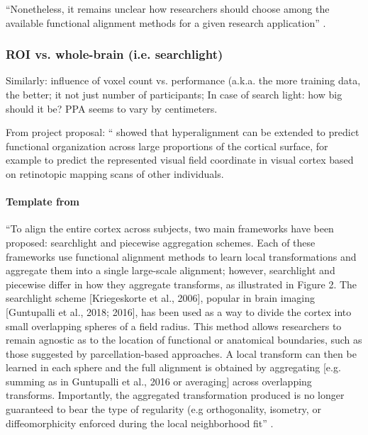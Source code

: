 %
``Nonetheless, it remains unclear how researchers should choose among the
available functional alignment methods for a given research application''
\citep{bazeille2021empirical}.


\subsubsection{ROI vs. whole-brain (i.e. searchlight)}


%
Similarly: influence of voxel count vs. performance (a.k.a. the more training
data, the better; it not just number of participants;
%
In case of search light: how big should it be? PPA seems to vary by centimeters.

From project proposal: ``\citet{guntupalli2016model} showed that hyperalignment
can be extended to predict functional organization across large proportions of
the cortical surface, for example to predict the represented visual field
coordinate in visual cortex based on retinotopic mapping scans of other
individuals.


\paragraph{Template from \citet{bazeille2021empirical}}
%
``To align the entire cortex across subjects, two main frameworks have been
proposed: searchlight and piecewise aggregation schemes.
%
Each of these frameworks use functional alignment methods to learn local
transformations and aggregate them into a single large-scale alignment;
%
however, searchlight and piecewise differ in how they aggregate transforms, as
illustrated in Figure 2.
%
The searchlight scheme [Kriegeskorte et al., 2006], popular in brain imaging
[Guntupalli et al., 2018; 2016], has been used as a way to divide the cortex
into small overlapping spheres of a field radius.
%
This method allows researchers to remain agnostic as to the location of
functional or anatomical boundaries, such as those suggested by
parcellation-based approaches.
%
A local transform can then be learned in each sphere and the full alignment is
obtained by aggregating [e.g. summing as in Guntupalli et al., 2016 or
averaging] across overlapping transforms.
%
Importantly, the aggregated transformation produced is no longer guaranteed to
bear the type of regularity (e.g orthogonality, isometry, or diffeomorphicity
enforced during the local neighborhood fit'' \citep{bazeille2021empirical}.

